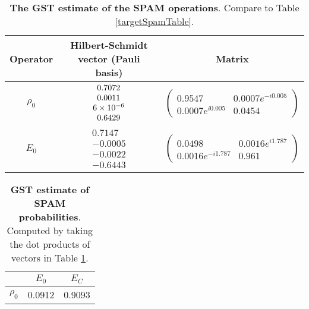 {\begin{table}[h]
\begin{center}
\begin{tabular}[l]{|c|c|c|}
\hline
Operator & Hilbert-Schmidt vector (Pauli basis) & Matrix \\ \hline
$\rho_{0}$ & $ \begin{array}{c}
0.7072 \\ 
0.0011 \\ 
6\times 10^{-6} \\ 
0.6429
 \end{array} $
 & $ \left(\!\!\begin{array}{cc}
0.9547 & 0.0007e^{-i0.005} \\ 
0.0007e^{i0.005} & 0.0454
 \end{array}\!\!\right) $
 \\ \hline
$E_{0}$ & $ \begin{array}{c}
0.7147 \\ 
-0.0005 \\ 
-0.0022 \\ 
-0.6443
 \end{array} $
 & $ \left(\!\!\begin{array}{cc}
0.0498 & 0.0016e^{i1.787} \\ 
0.0016e^{-i1.787} & 0.961
 \end{array}\!\!\right) $
 \\ \hline
\end{tabular}

\caption{\textbf{The GST estimate of the SPAM operations}.  Compare to Table \ref{targetSpamTable}.\label{bestCPTPGatesetSpamTable}}
\end{center}
\end{table}

\begin{table}[h]
\begin{center}
\begin{tabular}[l]{|c|c|c|}
\hline
 & $E_{0}$ & $E_C$ \\ \hline
$\rho_{0}$ & 0.0912 & 0.9093 \\ \hline
\end{tabular}

\caption{\textbf{GST estimate of SPAM probabilities}.  Computed by taking the dot products of vectors in Table \ref{bestCPTPGatesetSpamTable}.\label{bestCPTPGatesetSpamParametersTable}}
\end{center}
\end{table}

}
